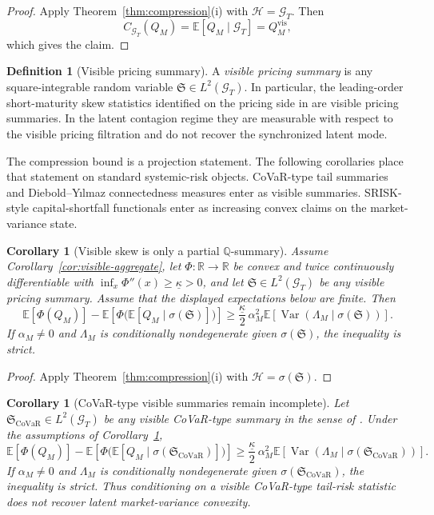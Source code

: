 \documentclass[11pt,a4paper]{amsart}
\theoremstyle{plain}
\newtheorem{corollary}[theorem]{Corollary}
\theoremstyle{definition}
\newtheorem{definition}[theorem]{Definition}
\theoremstyle{remark}
\DeclareMathOperator{\Var}{Var}
\newcommand{\R}{\mathbb{R}}
\newcommand{\QQ}{\mathbb{Q}}
\newcommand{\EE}{\mathbb{E}}
\newcommand{\cH}{\mathcal{H}}
\newcommand{\cG}{\mathcal{G}}
\begin{document}
\begin{proof}
Apply Theorem~\ref{thm:compression}(i) with \(\cH=\cG_T\).  Then
\[
        C_{\cG_T}(Q_M)=\EE[Q_M\mid \cG_T]=Q_M^{\mathrm{vis}},
\]
which gives the claim.
\end{proof}

\begin{definition}[Visible pricing summary]
A \emph{visible pricing summary} is any square-integrable random variable
\(\mathfrak S\in L^2(\cG_T)\).  In particular, the leading-order short-maturity skew statistics
identified on the pricing side in \cite{vidal2026latent} are visible pricing summaries.  In the
latent contagion regime they are measurable with respect to the visible pricing filtration and do
not recover the synchronized latent mode.
\end{definition}

The compression bound is a projection statement.  The following corollaries place that statement on
standard systemic-risk objects.  CoVaR-type tail summaries and Diebold--Y\i lmaz connectedness
measures enter as visible summaries.  SRISK-style capital-shortfall functionals enter as increasing
convex claims on the market-variance state.

\begin{corollary}[Visible skew is only a partial \(\QQ\)-summary]\label{cor:visible-summary}
Assume Corollary~\ref{cor:visible-aggregate}, let \(\Phi\colon\R\to\R\) be convex and
twice continuously differentiable with \(\inf_x\Phi''(x)\ge \underline\kappa>0\), and let
\(\mathfrak S\in L^2(\cG_T)\) be any visible pricing summary.  Assume that the displayed
expectations below are finite.  Then
\[
        \EE[\Phi(Q_M)]
        -
        \EE\!\left[\Phi\!\bigl(\EE[Q_M\mid \sigma(\mathfrak S)]\bigr)\right]
        \ge
        \frac{\underline\kappa}{2}\,
        \alpha_M^2
        \EE\!\left[\Var(\Lambda_M\mid \sigma(\mathfrak S))\right].
\]
If \(\alpha_M\neq0\) and \(\Lambda_M\) is conditionally nondegenerate given \(\sigma(\mathfrak S)\),
the inequality is strict.
\end{corollary}

\begin{proof}
Apply Theorem~\ref{thm:compression}(i) with \(\cH=\sigma(\mathfrak S)\).
\end{proof}

\begin{corollary}[CoVaR-type visible summaries remain incomplete]\label{cor:covar-summary}
Let \(\mathfrak S_{\mathrm{CoVaR}}\in L^2(\cG_T)\) be any visible CoVaR-type summary in the sense
of \cite{adrian2016covar}.  Under the assumptions of Corollary~\ref{cor:visible-summary},
\[
        \EE[\Phi(Q_M)]
        -
        \EE\!\left[\Phi\!\bigl(\EE[Q_M\mid \sigma(\mathfrak S_{\mathrm{CoVaR}})]\bigr)\right]
        \ge
        \frac{\underline\kappa}{2}\,
        \alpha_M^2
        \EE\!\left[\Var(\Lambda_M\mid \sigma(\mathfrak S_{\mathrm{CoVaR}}))\right].
\]
If \(\alpha_M\neq0\) and \(\Lambda_M\) is conditionally nondegenerate given
\(\sigma(\mathfrak S_{\mathrm{CoVaR}})\), the inequality is strict.  Thus conditioning on a
visible CoVaR-type tail-risk statistic does not recover latent market-variance convexity.
\end{corollary}
\end{document}
